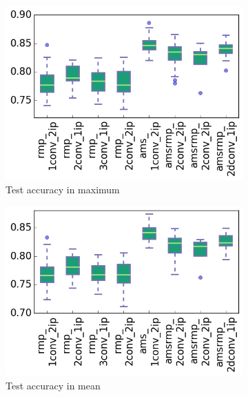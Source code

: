 \begin{figure}[htb]
\label{fig:results:clean}
\begin{subfigure}[t]{0.5\textwidth}
	\centering
	\includegraphics[scale=0.5]{images-architecture-clean/max_test_accuracy}
    \caption{Test accuracy in maximum}
	\label{fig:results:max_test_accuracy}
\end{subfigure}%
\begin{subfigure}[t]{0.5\textwidth}
	\centering
	\includegraphics[scale=0.5]{images-architecture-clean/mean_test_accuracy}
    \caption{Test accuracy in mean}
	\label{fig:results:mean_test_accuracy}
\end{subfigure}
\begin{subfigure}[t]{0.5\textwidth}
	\centering

\end{subfigure}
\end{figure}
